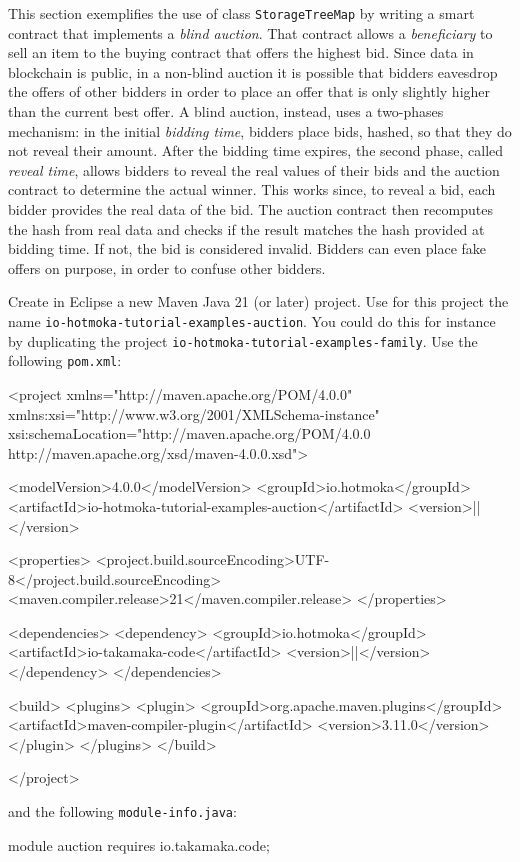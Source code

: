 This section exemplifies the use of class \texttt{StorageTreeMap} by writing a smart
contract that implements a \emph{blind auction}. That contract allows
a \emph{beneficiary} to sell an item to the buying contract that offers
the highest bid. Since data in blockchain is public, in a non-blind
auction it is possible that bidders eavesdrop the offers of other bidders
in order to place an offer that is only slightly higher than the current
best offer. A blind auction, instead, uses a two-phases
mechanism: in the initial \emph{bidding time}, bidders place bids, hashed, so that
they do not reveal their amount. After the bidding time expires, the second
phase, called \emph{reveal time}, allows bidders to
reveal the real values of their bids and the auction contract to determine
the actual winner.
This works since, to reveal a bid, each bidder provides the real data
of the bid. The auction contract then recomputes the hash from real data and
checks if the result matches the hash provided at bidding time.
If not, the bid is considered invalid. Bidders can even place fake offers
on purpose, in order to confuse other bidders.

Create in Eclipse a new Maven Java 21 (or later) project. Use for this project the name
\texttt{io-hotmoka-tutorial-examples-auction}.
You could do this for instance by duplicating the project \texttt{io-hotmoka-tutorial-examples-family}.
Use the following \texttt{pom.xml}:
%
\begin{codebox}\begin{xmllst}
<project xmlns="http://maven.apache.org/POM/4.0.0"
    xmlns:xsi="http://www.w3.org/2001/XMLSchema-instance"
    xsi:schemaLocation="http://maven.apache.org/POM/4.0.0 http://maven.apache.org/xsd/maven-4.0.0.xsd">

  <modelVersion>4.0.0</modelVersion>
  <groupId>io.hotmoka</groupId>
  <artifactId>io-hotmoka-tutorial-examples-auction</artifactId>
  <version>|\hotmokaVersion{}|</version>

  <properties>
    <project.build.sourceEncoding>UTF-8</project.build.sourceEncoding>
    <maven.compiler.release>21</maven.compiler.release>
  </properties>

  <dependencies>
    <dependency>
      <groupId>io.hotmoka</groupId>
      <artifactId>io-takamaka-code</artifactId>
      <version>|\takamakaVersion{}|</version>
    </dependency>
  </dependencies>

  <build>
    <plugins>
      <plugin>
        <groupId>org.apache.maven.plugins</groupId>
        <artifactId>maven-compiler-plugin</artifactId>
        <version>3.11.0</version>
      </plugin>
    </plugins>
  </build>

</project>
\end{xmllst}\end{codebox}
%
and the following \texttt{module-info.java}:
%
\begin{codebox}\begin{javalst}
module auction {
  requires io.takamaka.code;
}
\end{javalst}\end{codebox}

